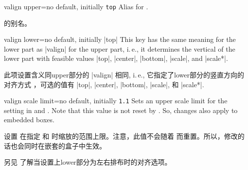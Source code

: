 \begin{docTcbKey}[][doc new=2015-05-07]{valign upper}{=}{no default, initially \texttt{top}}
Alias for .

 的别名。
\end{docTcbKey}

\begin{docTcbKey}{valign lower}{=}{no default, initially |top|}
This key has the same meaning for the lower part as |valign|
for the upper part, i.\,e., it determines
the vertical  of the lower part with feasible values
|top|, |center|, |bottom|, |scale|, and |scale*|.

此项设置含义同upper部分的 |valign| 相同, i.\,e., 它指定了lower部分的竖直方向的对齐方式  ，可选的值有 |top|, |center|, |bottom|, |scale|, 和 |scale*|.

\end{docTcbKey}

\begin{docTcbKey}[][doc new=2015-07-16]{valign scale limit}{=}{no default, initially \texttt{1.1}}
Sets an upper scale limit for the  setting in
 and .
Note that this value is not reset by . So, changes
also apply to embedded boxes.

设置  在指定  和  时缩放的范围上限。注意，此值不会随着  而重置。所以，修改的话也会同时在嵌套的盒子中生效。
\end{docTcbKey}


另见  了解当设置上lower部分为左右排布时的对齐选项。